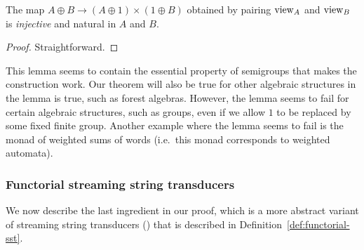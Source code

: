 \begin{lemma}
\label{lem:views}
The map $A \oplus B \to (A \oplus 1) \times (1 \oplus B)$ obtained by pairing $\mathrm{view}_A$ and $\mathrm{view}_B$ is \emph{injective} and natural in $A$ and $B$.
\end{lemma}
\begin{proof}
    Straightforward.
\end{proof}

This lemma seems to contain the essential property of semigroups that makes the construction work. Our theorem will also be true for other algebraic structures in the lemma is true, such as forest algebras. However, the lemma seems to fail for certain algebraic structures, such as groups, even if we allow $1$ to be replaced by some fixed finite group. Another example where the lemma seems to fail is the monad of weighted sums of words (i.e.~this monad corresponds to weighted automata).

\subsubsection{Functorial streaming string transducers}
\label{sec:functorial-sst}
We now describe the last ingredient in our proof, which is a more abstract variant  of streaming string transducers (\sst) that is described in Definition~\ref{def:functorial-sst}. 

